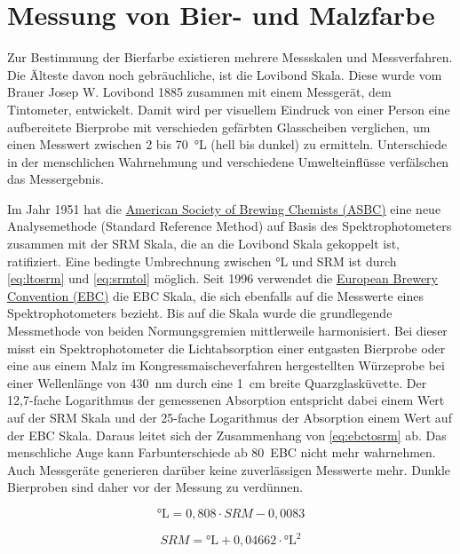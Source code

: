 \documentclass[a4paper,parskip=half]{scrartcl}
\newcommand{\SRM}{\mathit{SRM}}
\begin{document}
\section*{Messung von Bier- und Malzfarbe}

Zur Bestimmung der Bierfarbe existieren mehrere Messskalen und Messverfahren. Die Älteste davon noch gebräuchliche, ist die Lovibond Skala. Diese wurde vom Brauer Josep W. Lovibond 1885 zusammen mit einem Messgerät, dem Tintometer, entwickelt. Damit wird per visuellem Eindruck von einer Person eine aufbereitete Bierprobe mit verschieden gefärbten Glasscheiben verglichen, um einen Messwert zwischen 2 bis 70~°L (hell bis dunkel) zu ermitteln. Unterschiede in der menschlichen Wahrnehmung und verschiedene Umwelteinflüsse verfälschen das Messergebnis. \parencite{KrausWeyermann2021a}

Im Jahr 1951 hat die \href{https://www.asbcnet.org}{American Society of Brewing Chemists (ASBC)} eine neue Analysemethode (Standard Reference Method) auf Basis des Spektrophotometers zusammen mit der SRM Skala, die an die Lovibond Skala gekoppelt ist, ratifiziert. Eine bedingte Umbrechnung zwischen °L und SRM ist durch \autoref{eq:ltosrm} und \autoref{eq:srmtol} möglich. Seit 1996 verwendet die \href{https://europeanbreweryconvention.eu}{European Brewery Convention (EBC)} die EBC Skala, die sich ebenfalls auf die Messwerte eines Spektrophotometers bezieht. Bis auf die Skala wurde die grundlegende Messmethode von beiden Normungsgremien mittlerweile harmonisiert. Bei dieser misst ein Spektrophotometer die Lichtabsorption einer entgasten Bierprobe oder eine aus einem Malz im Kongressmaischeverfahren hergestellten Würzeprobe bei einer Wellenlänge von 430~nm durch eine 1~cm breite Quarzglasküvette. Der 12,7-fache Logarithmus der gemessenen Absorption entspricht dabei einem Wert auf der SRM Skala und der 25-fache Logarithmus der Absorption einem Wert auf der EBC Skala. Daraus leitet sich der Zusammenhang von \autoref{eq:ebctosrm} ab. Das menschliche Auge kann Farbunterschiede ab 80~EBC nicht mehr wahrnehmen. Auch Messgeräte generieren darüber keine zuverlässigen Messwerte mehr. Dunkle Bierproben sind daher vor der Messung zu verdünnen. \parencite{KrausWeyermann2021a}

\begin{equation}
\textrm{°L} = 0,808 \cdot \SRM - 0,0083
\label{eq:ltosrm}
\end{equation}

\begin{equation}
\SRM = \textrm{°L} + 0,04662 \cdot \textrm{°L}^2
\label{eq:srmtol}
\end{equation}
\end{document}

